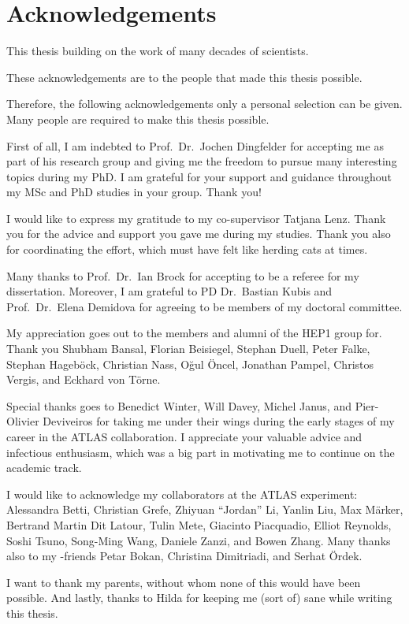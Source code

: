 \chapter*{Acknowledgements}

This thesis building on the work of many decades of scientists.

These acknowledgements are to the people that made this thesis possible.

Therefore, the following acknowledgements only a personal selection can be
given. Many people are required to make this thesis possible.





First of all, I am indebted to Prof.\ Dr.\ Jochen Dingfelder for accepting me as
part of his research group and giving me the freedom to pursue many interesting
topics during my PhD. I am grateful for your support and guidance throughout my
MSc and PhD studies in your group. Thank you!

I would like to express my gratitude to my co-supervisor Tatjana Lenz. Thank you
for the advice and support you gave me during my studies. Thank you also for
coordinating the \bbtautau effort, which must have felt like herding cats at
times.

Many thanks to Prof.\ Dr.\ Ian Brock for accepting to be a referee for my
dissertation. Moreover, I am grateful to PD Dr.\ Bastian Kubis and Prof.\ Dr.\
Elena Demidova for agreeing to be members of my doctoral committee.

My appreciation goes out to the members and alumni of the \textsc{HEP1} group
for. Thank you Shubham Bansal, Florian Beisiegel, Stephan Duell, Peter Falke,
Stephan Hageböck, Christian Nass, Oğul Öncel, Jonathan Pampel, Christos Vergis,
and Eckhard von Törne.

Special thanks goes to Benedict Winter, Will Davey, Michel Janus, and
Pier-Olivier Deviveiros for taking me under their wings during the early stages
of my career in the ATLAS collaboration. I appreciate your valuable advice and
infectious enthusiasm, which was a big part in motivating me to continue on the
academic track.

I would like to acknowledge my collaborators at the ATLAS experiment: Alessandra
Betti, Christian Grefe, Zhiyuan ``Jordan'' Li, Yanlin Liu, Max Märker, Bertrand
Martin Dit Latour, Tulin Mete, Giacinto Piacquadio, Elliot Reynolds, Soshi
Tsuno, Song-Ming Wang, Daniele Zanzi, and Bowen Zhang. Many thanks also to my
\bbtautau-friends Petar Bokan, Christina Dimitriadi, and Serhat Ördek.

I want to thank my parents, without whom none of this would have been
possible. And lastly, thanks to Hilda for keeping me (sort of) sane while
writing this thesis.


